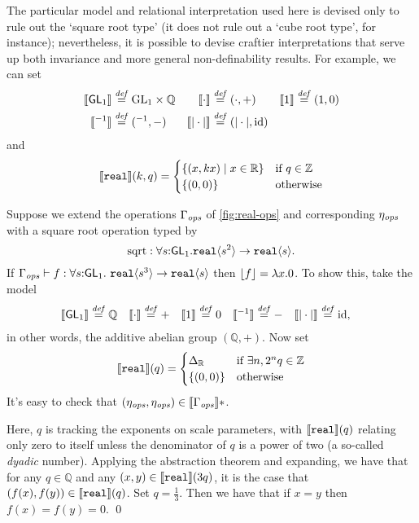 The particular model and relational interpretation used here is devised only to
rule out the `square root type' (it does not rule out a `cube root type', for instance); 
nevertheless, it is possible to devise craftier interpretations that serve up both invariance
and more general non-definability results. For example, we can set
\begin{align*}
\semSort{\SynGL{1}} & \isDefinedAs \mathbb \mathbb \GL{1} \times \mathbb Q &
\semIndexExp{\cdot} & \isDefinedAs (\cdot,+) & 
\semIndexExp{1} & \isDefinedAs (1,0) \\
\semIndexExp{{}^{-1}} & \isDefinedAs \mathrm{({}^{-1},-)} &
\semIndexExp{|\cdot|} & \isDefinedAs \mathrm{(|\cdot|,\mathrm{id})}
\end{align*}
and
\[
\llbracket \textup{\texttt{real}} \rrbracket(k,q) = 
  {\begin{cases} \{(x,k x) \mathrel| x \in \mathbb R \} & \text{if }q \in \mathbb Z\\
                      \{(0,0)\} & \text{otherwise}
  \end{cases}}
\]

\begin{example}\label{ex:cube-root-nondef}
Suppose we extend the operations $\Gamma_{\mathit{ops}}$ of \autoref{fig:real-ops}
and corresponding $\eta_{\mathit{ops}}$ with a square root operation typed by
\[
\mathrm{sqrt} : \forall s\mathord: \mathsf{GL}_1.\textup{\texttt{real}}\langle s^2 \rangle \to \textup{\texttt{real}}\langle s \rangle.
\]
If  $\Gamma_{\mathit{ops}} \vdash f : \forall s \mathord: \mathsf{GL}_1.\
\textup{\texttt{real}}\langle s^3 \rangle \to \textup{\texttt{real}}\langle s \rangle$ 
then $\left\lfloor{f}\right\rfloor = \lambda x.0$.
To show this, take the model
\begin{align*}
\llbracket \mathsf{GL}_1 \rrbracket & \stackrel{\mathit{def}}= \mathbb Q &
\llbracket \cdot \rrbracket & \stackrel{\mathit{def}}= + & 
\llbracket 1 \rrbracket & \stackrel{\mathit{def}}= 0 &
\llbracket {}^{-1} \rrbracket & \stackrel{\mathit{def}}= \mathrm{-} &
\llbracket |\cdot| \rrbracket & \stackrel{\mathit{def}}= \mathrm{id},
\end{align*}
in other words, the additive abelian group $(\mathbb Q, +)$. 
Now set
\[
\llbracket \textup{\texttt{real}} \rrbracket(q) =
\begin{cases} \Delta_{\mathbb R} & \text{if }\exists n, 2^n q \in\mathbb Z\\
\{(0,0)\} & \text{otherwise}
\end{cases}
\]
It's easy to check that $(\eta_{\mathit{ops}},\eta_{\mathit{ops}})\in\llbracket \Gamma_{\mathit{ops}} \rrbracket*$.

Here, $q$ is tracking the exponents on scale parameters, with
$\llbracket \textup{\texttt{real}} \rrbracket(q)$ relating only zero to itself
unless the denominator of $q$ is a power of two (a so-called
\emph{dyadic} number).  
Applying the abstraction theorem and expanding, we have that for
any
$q\in\mathbb Q$ and any
$(x,y)\in\llbracket \textup{\texttt{real}} \rrbracket(3q)$, it is the case that
$(f(x),f(y))\in\llbracket \textup{\texttt{real}} \rrbracket(q)$. Set $q = \frac 1 3$.  
Then we have that if $x=y$ then $f(x)=f(y)=0$.
\qed
\end{example}

